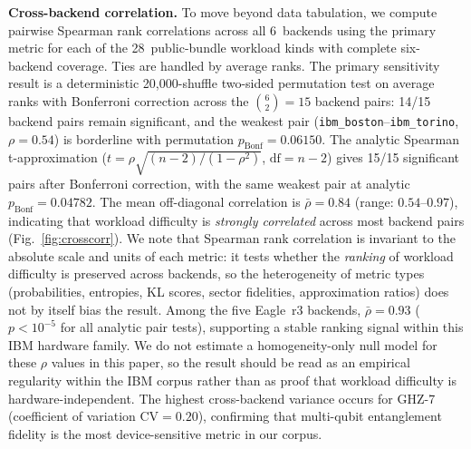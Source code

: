\documentclass[aps,prxquantum,twocolumn,superscriptaddress,amsmath,amssymb,longbibliography,floatfix]{revtex4-2}
\begin{document}
\textbf{Cross-backend correlation.} To move beyond data tabulation, we compute pairwise Spearman rank correlations across all 6~backends using the primary metric for each of the 28~public-bundle workload kinds with complete six-backend coverage. Ties are handled by average ranks. The primary sensitivity result is a deterministic 20{,}000-shuffle two-sided permutation test on average ranks with Bonferroni correction across the $\binom{6}{2}=15$ backend pairs: 14/15 backend pairs remain significant, and the weakest pair (\texttt{ibm\_boston}--\texttt{ibm\_torino}, $\rho = 0.54$) is borderline with permutation $p_{\text{Bonf}} = 0.06150$. The analytic Spearman t-approximation ($t = \rho\sqrt{(n-2)/(1-\rho^2)}$, $\text{df}=n-2$) gives 15/15 significant pairs after Bonferroni correction, with the same weakest pair at analytic $p_{\text{Bonf}} = 0.04782$. The mean off-diagonal correlation is $\bar{\rho} = 0.84$ (range: $0.54$--$0.97$), indicating that workload difficulty is \emph{strongly correlated} across most backend pairs (Fig.~\ref{fig:crosscorr}). We note that Spearman rank correlation is invariant to the absolute scale and units of each metric: it tests whether the \emph{ranking} of workload difficulty is preserved across backends, so the heterogeneity of metric types (probabilities, entropies, KL scores, sector fidelities, approximation ratios) does not by itself bias the result. Among the five Eagle~r3 backends, $\bar{\rho} = 0.93$ ($p < 10^{-5}$ for all analytic pair tests), supporting a stable ranking signal within this IBM hardware family. We do not estimate a homogeneity-only null model for these $\rho$ values in this paper, so the result should be read as an empirical regularity within the IBM corpus rather than as proof that workload difficulty is hardware-independent. The highest cross-backend variance occurs for GHZ-7 (coefficient of variation $\text{CV} = 0.20$), confirming that multi-qubit entanglement fidelity is the most device-sensitive metric in our corpus.
\end{document}
